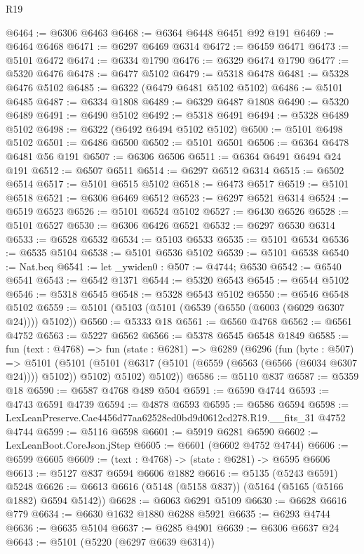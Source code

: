 \begin{lexlean}{R19}
\begin{coremodule}
{{{{{{{{{{{@6464 := @6306 @6463
@6468 := @6364 @6448 @6451 @92 @191
@6469 := @6464 @6468
@6471 := @6297 @6469 @6314
@6472 := @6459 @6471
@6473 := @5101 @6472
@6474 := @6334 @1790
@6476 := @6329 @6474 @1790
@6477 := @5320 @6476
@6478 := @6477 @5102
@6479 := @5318 @6478
@6481 := @5328 @6476 @5102
@6485 := @6322 (@6479 @6481 @5102 @5102)
@6486 := @5101 @6485
@6487 := @6334 @1808
@6489 := @6329 @6487 @1808
@6490 := @5320 @6489
@6491 := @6490 @5102
@6492 := @5318 @6491
@6494 := @5328 @6489 @5102
@6498 := @6322 (@6492 @6494 @5102 @5102)
@6500 := @5101 @6498 @5102
@6501 := @6486 @6500
@6502 := @5101 @6501
@6506 := @6364 @6478 @6481 @56 @191
@6507 := @6306 @6506
@6511 := @6364 @6491 @6494 @24 @191
@6512 := @6507 @6511
@6514 := @6297 @6512 @6314
@6515 := @6502 @6514
@6517 := @5101 @6515 @5102
@6518 := @6473 @6517
@6519 := @5101 @6518
@6521 := @6306 @6469 @6512
@6523 := @6297 @6521 @6314
@6524 := @6519 @6523
@6526 := @5101 @6524 @5102
@6527 := @6430 @6526
@6528 := @5101 @6527
@6530 := @6306 @6426 @6521
@6532 := @6297 @6530 @6314
@6533 := @6528 @6532
@6534 := @5103 @6533
@6535 := @5101 @6534
@6536 := @6535 @5104
@6538 := @5101 @6536 @5102
@6539 := @5101 @6538
@6540 := Nat.beq
@6541 := let _ywiden0 : @507 := @4744; @6530
@6542 := @6540 @6541
@6543 := @6542 @1371
@6544 := @5320 @6543
@6545 := @6544 @5102
@6546 := @5318 @6545
@6548 := @5328 @6543 @5102
@6550 := @6546 @6548 @5102
@6559 := @5101 (@5103 (@5101 (@6539 (@6550 (@6003 (@6029 @6307 @24)))) @5102))
@6560 := @5333 @18
@6561 := @6560 @4768
@6562 := @6561 @4752
@6563 := @5227 @6562
@6566 := @5378 @6545 @6548 @1849
@6585 := fun (text : @4768) =>
  fun (state : @6281) =>
  @6289
    (@6296
      (fun (byte : @507) =>
      @5101
        (@5101 (@5101 (@6317 (@5101 (@6559 (@6563 (@6566 (@6034 @6307 @24)))) @5102)) @5102) @5102)
        @5102))
@6586 := @5110 @837
@6587 := @5359 @18
@6590 := @6587 @4768 @489 @504
@6591 := @6590 @4744
@6593 := @4743 @6591 @4739
@6594 := @4878 @6593
@6595 := @6586 @6594
@6598 := LexLeanPreserve.Cae4456d77aa62528ed0bd9d0612cd278.R19.__fits_31 @4752 @4744
@6599 := @5116 @6598
@6601 := @5919 @6281 @6590
@6602 := LexLeanBoot.CoreJson.jStep
@6605 := @6601 (@6602 @4752 @4744)
@6606 := @6599 @6605
@6609 := (text : @4768) -> (state : @6281) -> @6595 @6606
@6613 := @5127 @837 @6594 @6606 @1882
@6616 := @5135 (@5243 @6591) @5248
@6626 := @6613 @6616 (@5148 (@5158 @837)) (@5164 (@5165 (@5166 @1882) @6594 @5142))
@6628 := @6063 @6291 @5109
@6630 := @6628 @6616 @779
@6634 := @6630 @1632 @1880 @6288 @5921
@6635 := @6293 @4744
@6636 := @6635 @5104
@6637 := @6285 @4901
@6639 := @6306 @6637 @24
@6643 := @5101 (@5220 (@6297 @6639 @6314))
}}}}}}}}}}}
\end{coremodule}
\end{lexlean}
